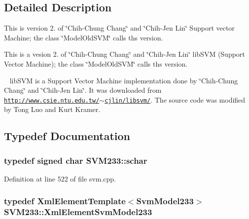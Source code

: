 \subsection{Detailed Description}
This is version 2. of \char`\"{}\+Chih-\/\+Chung Chang\char`\"{} and \char`\"{}\+Chih-\/\+Jen Lin\char`\"{} Support vector Machine; the class \char`\"{}\+Model\+Old\+S\+V\+M\char`\"{} calls ths version. 

This is a vesion 2. of \char`\"{}\+Chih-\/\+Chung Chang\char`\"{} and \char`\"{}\+Chih-\/\+Jen Lin\char`\"{} lib\+S\+VM (Support Vector Machine); the class \char`\"{}\+Model\+Old\+S\+V\+M\char`\"{} calls ths version.

~\newline
 lib\+S\+VM is a Support Vector Machine implementation done by \char`\"{}\+Chih-\/\+Chung Chang\char`\"{} and \char`\"{}\+Chih-\/\+Jen Lin\char`\"{}. It was downloaded from \href{http://www.csie.ntu.edu.tw/~cjlin/libsvm/}{\tt http\+://www.\+csie.\+ntu.\+edu.\+tw/$\sim$cjlin/libsvm/}. The source code was modified by Tong Luo and Kurt Kramer. 

\subsection{Typedef Documentation}
\subsubsection[{\texorpdfstring{schar}{schar}}]{\setlength{\rightskip}{0pt plus 5cm}typedef signed char {\bf S\+V\+M233\+::schar}}\hypertarget{namespace_s_v_m233_afb4ec48497a25626275d52266ac9d7d8}{}\label{namespace_s_v_m233_afb4ec48497a25626275d52266ac9d7d8}


Definition at line 522 of file svm.\+cpp.

\subsubsection[{\texorpdfstring{Xml\+Element\+Svm\+Model233}{XmlElementSvmModel233}}]{\setlength{\rightskip}{0pt plus 5cm}typedef {\bf Xml\+Element\+Template}$<${\bf Svm\+Model233}$>$ {\bf S\+V\+M233\+::\+Xml\+Element\+Svm\+Model233}}\hypertarget{namespace_s_v_m233_ac980a127b814b032d64ad46c43530ac0}{}\label{namespace_s_v_m233_ac980a127b814b032d64ad46c43530ac0}


